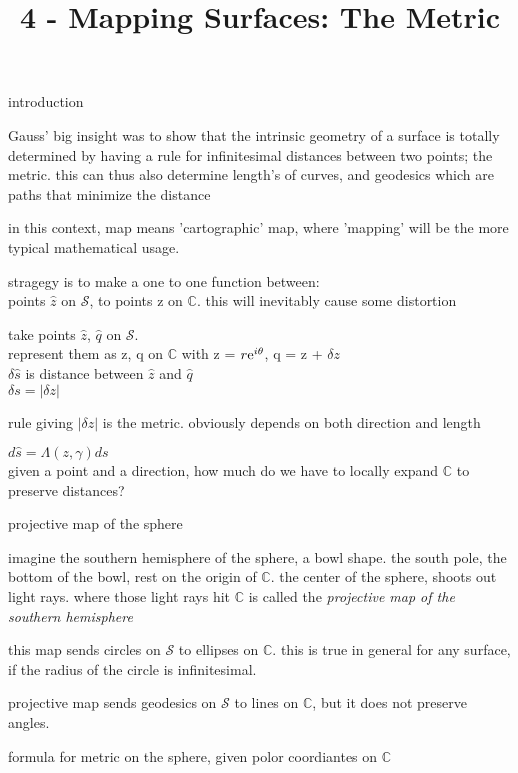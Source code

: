 \documentclass{article}
\title{4 - Mapping Surfaces: The Metric}
\newenvironment{andrew_section}[1]
    {
    \section{#1}
    \begin{itemize}
    }
    {
    \end{itemize}
    }
\begin{document}
\maketitle

\begin{andrew_section}{introduction}
    \item 
        Gauss' big insight was to show that the intrinsic geometry of
        a surface is totally determined by having a rule for infinitesimal
        distances between two points; the metric.  this can thus also determine
        length's of curves, and geodesics which are paths that minimize the distance
    \item 
        in this context, map means 'cartographic' map, where 'mapping'
        will be the more typical mathematical usage.  
    \item 
        stragegy is to make a one to one function between: \\
         points $\hat{z}$ on $\mathcal{S}$, to points z on $\mathbb{C}$.  this will
         inevitably cause some distortion
    \item 
        take points $\hat{z}$, $\hat{q}$ on $\mathcal{S}$.  \\
        represent them as z, q on $\mathbb{C}$ with z = $r{\rm e}^{i\theta}$,
        q = z + $\delta z$ \\
        $\delta \hat{s}$ is distance between $\hat{z}$ and $\hat{q}$ \\
        $\delta s = |\delta z|$
    \item 
        rule giving  $|\delta z|$ is the metric.  obviously depends on both
        direction and length 
    \item 
        $d \hat{s} = \Lambda (z, \gamma) ds$ \\ 
        given a point and a direction, how much do we have to locally
        expand $\mathbb{C}$ to preserve distances?
\end{andrew_section}

\begin{andrew_section}{projective map of the sphere}
    \item 
        imagine the southern hemisphere of the sphere, a bowl shape.
        the south pole, the bottom of the bowl, rest on the origin of
        $\mathbb{C}$. the center of the sphere, shoots out light rays.
        where those light rays hit $\mathbb{C}$ is called the 
        \emph{projective map of the southern hemisphere}
    \item 
        this map sends circles on $\mathcal{S}$ to ellipses on $\mathbb{C}$.
        this is true in general for any surface, if the radius of the circle is
        infinitesimal.
    \item 
        projective map sends geodesics on $\mathcal{S}$ to lines on 
        $\mathbb{C}$, but it does not preserve angles.
    \item 
        formula for metric on the sphere, given polor coordiantes on
        $\mathbb{C}$

\end{andrew_section}
\end{document}
